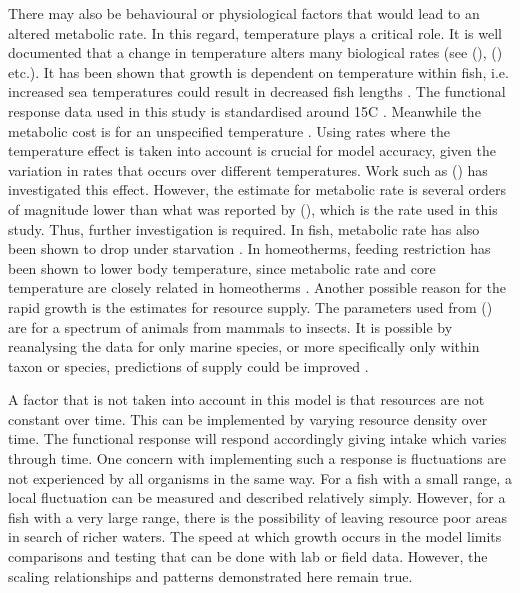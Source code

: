 \documentclass[a4paper, 11pt, hidelinks]{article} %
\begin{document}
	There may also be behavioural or physiological factors that would lead to an altered metabolic rate.  
	In this regard, temperature plays a critical role.  It is well documented that a change in temperature alters many biological rates  (see \citeauthor{Peters1983} (\citeyear{Peters1983}), \citeauthor{Gillooly2001} (\citeyear{Gillooly2001}) etc.).  
	It has been shown that growth is dependent on temperature within fish, i.e. increased sea temperatures could result in decreased fish lengths \parencite{VanRijn2017}. %
	The functional response data used in this study is standardised around 15\textdegree{}C \parencite{Pawar2012}.
	Meanwhile the metabolic cost is for an unspecified temperature \parencite{Peters1983}.  Using rates where the temperature effect is taken into account is crucial for model accuracy, given the variation in rates that occurs over different temperatures.  Work such as \citeauthor{Barneche2014} (\citeyear{Barneche2014}) has investigated this effect.  However, the estimate for metabolic rate is several orders of magnitude lower than what was reported by \citeauthor{Peters1983} (\citeyear{Peters1983}), which is the rate used in this study.  Thus, further investigation is required.  %
	In fish, metabolic rate has also been shown to drop under starvation \parencite{Cook2000}.  In homeotherms, feeding restriction has been shown to lower body temperature, since metabolic rate and core temperature are closely related in homeotherms \parencite{Ballor1991, Blanc2003,}.  
	Another possible reason for the rapid growth is the estimates for resource supply.  The parameters used from \citeauthor{Pawar2012} (\citeyear{Pawar2012}) are for a spectrum of animals from mammals to insects.  It is possible by reanalysing the data for only marine species, or more specifically only within taxon or species, predictions of supply could be improved \parencite{Marshall2019}.  %
	
	A factor that is not taken into account in this model is that resources are not constant over time.  This can be implemented by varying resource density over time.  The functional response will respond accordingly giving intake which varies through time.  One concern with implementing such a response is fluctuations are not experienced by all organisms in the same way.  For a fish with a small range, a local fluctuation can be measured and described relatively simply.  However, for a fish with a very large range, there is the possibility of leaving resource poor areas in search of richer waters.
	The speed at which growth occurs in the model limits comparisons and testing that can be done with lab or field data.  However, the scaling relationships and patterns demonstrated here remain true.
\end{document}
